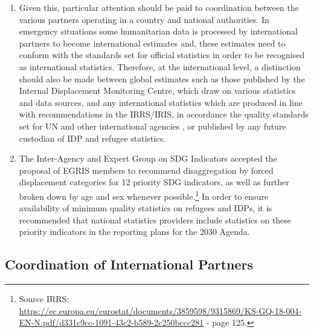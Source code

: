 \documentclass[
]{article}
\begin{document}
\begin{enumerate}
\item
  Given this, particular attention should be paid to coordination
  between the various partners operating in a country and national
  authorities. In emergency situations some humanitarian data is
  processed by international partners to become international
  estimates and, these estimates need to conform with the standards
  set for official statistics in order to be recognised as
  international statistics. Therefore, at the international level, a
  distinction should also be made between global estimates such as
  those published by the Internal Displacement Monitoring Centre,
  which draw on various statistics and data sources, and any
  international statistics which are produced in line with
  recommendations in the IRRS/IRIS, in accordance the quality
  standards set for UN and other international agencies , or published
  by any future custodian of IDP and refugee statistics.
\item
  The Inter-Agency and Expert Group on SDG Indicators accepted the
  proposal of EGRIS members to recommend disaggregation by forced
  displacement categories for 12 priority SDG indicators, as well as
  further broken down by age and sex whenever possible.\footnote{Source IRRS:
    \url{https://ec.europa.eu/eurostat/documents/3859598/9315869/KS-GQ-18-004-EN-N.pdf/d331c9cc-1091-43c2-b589-2c250bccc281}
    - page 125.} In order
  to ensure availability of minimum quality statistics on refugees and
  IDPs, it is recommended that national statistics providers include
  statistics on these priority indicators in the reporting plans for
  the 2030 Agenda.
\end{enumerate}

\hypertarget{coordination-of-international-partners}{%
\subsection{Coordination of International Partners}\label{coordination-of-international-partners}}
\end{document}
